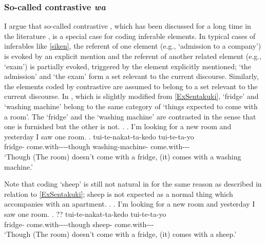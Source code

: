 \subsubsection{So-called contrastive \textit{wa}}


I argue that so-called contrastive ,
which has been discussed for a long time in the literature \cite[e.g.,][]{kuno73},
is a special case for  coding inferable elements.
In typical cases of inferables like \ref{siken},
the referent of one element (e.g.,  `admission to a company') is evoked by an explicit mention and the referent of another related element (e.g.,  `exam') is partially evoked, triggered by the element explicitly mentioned;
`the admission' and `the exam' form a set relevant to the current discourse.
Similarly, the elements coded by contrastive 
are assumed to belong to a set relevant to the current discourse.
In \Next, which is slightly modified from \ref{ExSentakuki},
 `fridge' and  `washing machine' belong to the same category of `things expected to come with a room'.
The `fridge' and the `washing machine' are contrasted
in the sense that
one is furnished but the other is not.
%
\ex.
 \a. I'm looking for a new room and yesterday I saw one room.
 \bg.  tui-te-nakat-ta-kedo  tui-te-ta-yo \\
 	fridge- come.with----though washing-machine- come.with--- \\
	`Though (The room) doesn't come with a fridge, (it) comes with a washing machine.'

Note that  coding  `sheep' is still not natural in \Next
for the same reason as described in relation to \ref{ExSentakuki};
sheep is not expected as a normal thing which accompanies with an apartment.
%
\ex.
 \a. I'm looking for a new room and yesterday I saw one room.
 \bg. ?? tui-te-nakat-ta-kedo  tui-te-ta-yo \\
 	fridge- come.with----though sheep- come.with--- \\
	`Though (The room) doesn't come with a fridge, (it) comes with a sheep.'

